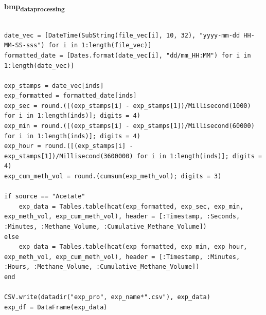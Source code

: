 \documentclass[11pt]{article}
\begin{document}
\textbf{bmp\textsubscript{data}\textsubscript{processing}}
\begin{verbatim}

date_vec = [DateTime(SubString(file_vec[i], 10, 32), "yyyy-mm-dd HH-MM-SS-sss") for i in 1:length(file_vec)]
formatted_date = [Dates.format(date_vec[i], "dd/mm_HH:MM") for i in 1:length(date_vec)]

exp_stamps = date_vec[inds]
exp_formatted = formatted_date[inds]
exp_sec = round.([(exp_stamps[i] - exp_stamps[1])/Millisecond(1000) for i in 1:length(inds)]; digits = 4)
exp_min = round.([(exp_stamps[i] - exp_stamps[1])/Millisecond(60000) for i in 1:length(inds)]; digits = 4)
exp_hour = round.([(exp_stamps[i] - exp_stamps[1])/Millisecond(3600000) for i in 1:length(inds)]; digits = 4)
exp_cum_meth_vol = round.(cumsum(exp_meth_vol); digits = 3)

if source == "Acetate"
    exp_data = Tables.table(hcat(exp_formatted, exp_sec, exp_min, exp_meth_vol, exp_cum_meth_vol), header = [:Timestamp, :Seconds, :Minutes, :Methane_Volume, :Cumulative_Methane_Volume])
else
    exp_data = Tables.table(hcat(exp_formatted, exp_min, exp_hour, exp_meth_vol, exp_cum_meth_vol), header = [:Timestamp, :Minutes, :Hours, :Methane_Volume, :Cumulative_Methane_Volume])
end

CSV.write(datadir("exp_pro", exp_name*".csv"), exp_data)
exp_df = DataFrame(exp_data)

\end{verbatim}
\end{document}
